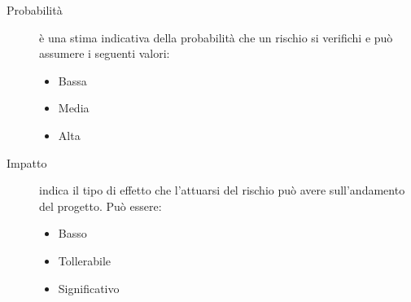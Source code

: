 \documentclass[../../norme-di-progetto.tex]{subfiles}
\begin{document}
\begin{description}
  \item[Probabilità] è una stima indicativa della probabilità che un rischio si verifichi e può assumere i seguenti valori:
        \begin{itemize}
          \item Bassa
          \item Media
          \item Alta
        \end{itemize}
  \item[Impatto] indica il tipo di effetto che l'attuarsi del rischio può avere sull'andamento del progetto. Può essere:
        \begin{itemize}
          \item Basso
          \item Tollerabile
          \item Significativo
        \end{itemize}
\end{description}




\end{document}
